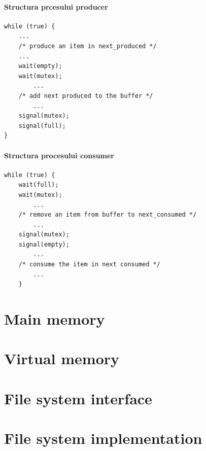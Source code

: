 \documentclass{article}
\begin{document}
\paragraph*{Structura prcesului producer}
\begin{center}
    \begin{lstlisting}
while (true) { 
    ...
    /* produce an item in next_produced */ 
    ... 
    wait(empty); 
    wait(mutex); 
        ...
    /* add next produced to the buffer */ 
        ... 
    signal(mutex); 
    signal(full); 
}
    \end{lstlisting}
\end{center}
\paragraph*{Structura procesului consumer}
\begin{center}
    \begin{lstlisting}
while (true) { 
    wait(full); 
    wait(mutex); 
        ...
    /* remove an item from buffer to next_consumed */ 
        ... 
    signal(mutex); 
    signal(empty); 
        ...
    /* consume the item in next consumed */ 
        ...
    }
    \end{lstlisting}
\end{center}

\section[Ch9 Main memory]{Main memory}
\section[Ch10 Virtual memory]{Virtual memory}
\section[Ch13 File system interface]{File system interface}
\section[Ch14 File system implementation]{File system implementation}
\end{document}
